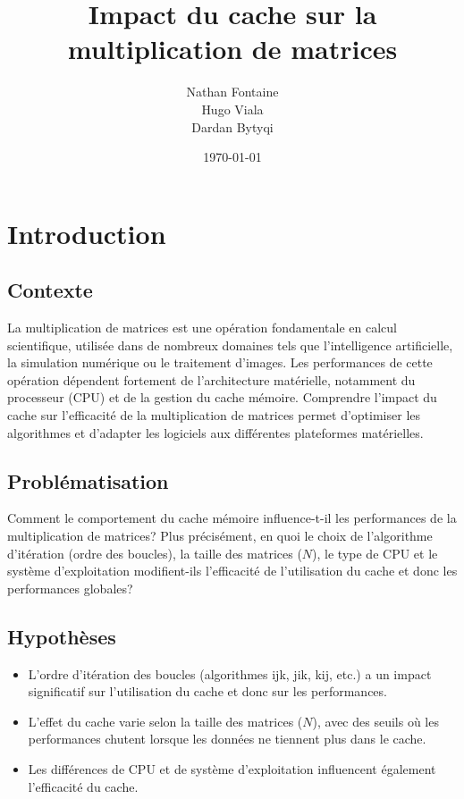 \documentclass[a4paper,12pt]{article}
\title{Impact du cache sur la multiplication de matrices}
\author{
    Nathan Fontaine
    \\ 
    Hugo Viala
    \\ 
    Dardan Bytyqi
    \\
    }
\date{\today}
\begin{document}
\maketitle

\section{Introduction}

\subsection*{Contexte}
La multiplication de matrices est une opération fondamentale en calcul scientifique, utilisée dans de nombreux domaines tels que l'intelligence artificielle, la simulation numérique ou le traitement d'images. Les performances de cette opération dépendent fortement de l'architecture matérielle, notamment du processeur (CPU) et de la gestion du cache mémoire. Comprendre l'impact du cache sur l'efficacité de la multiplication de matrices permet d'optimiser les algorithmes et d'adapter les logiciels aux différentes plateformes matérielles.

\subsection*{Problématisation}
Comment le comportement du cache mémoire influence-t-il les performances de la multiplication de matrices?
Plus précisément, en quoi le choix de l'algorithme d'itération (ordre des boucles), 
la taille des matrices (\(N\)), le type de CPU et le système d'exploitation modifient-ils 
l'efficacité de l'utilisation du cache et donc les performances globales?

\subsection*{Hypothèses}
\begin{itemize}
    \item L'ordre d'itération des boucles (algorithmes ijk, jik, kij, etc.) a un impact significatif sur l'utilisation du cache et donc sur les performances.
    \item L'effet du cache varie selon la taille des matrices (\(N\)), avec des seuils où les performances chutent lorsque les données ne tiennent plus dans le cache.
    \item Les différences de CPU et de système d'exploitation influencent également l'efficacité du cache.
\end{itemize}
\end{document}
